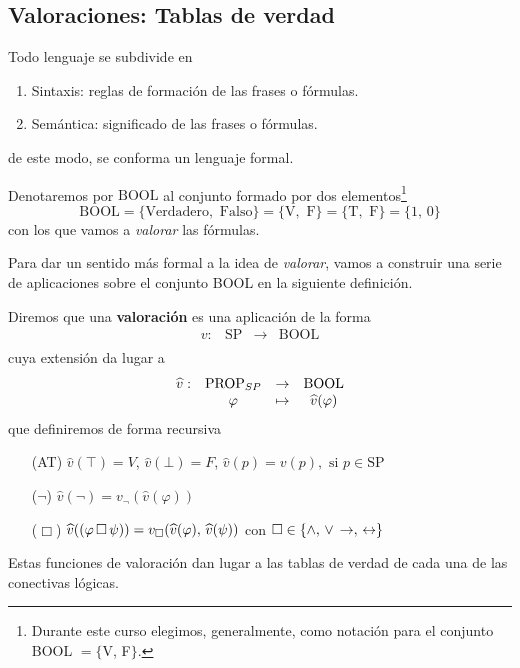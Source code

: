 \subsection*{Valoraciones: Tablas de verdad}
Todo lenguaje se subdivide en 
\begin{enumerate}
	\item Sintaxis: reglas de formación de las frases o fórmulas. 
	\item Semántica: significado de las frases o fórmulas. 
\end{enumerate}
de este modo, se conforma un lenguaje formal. 

\begin{definition} Denotaremos por $\mbox{BOOL}$ al conjunto formado por dos elementos\footnote{Durante este curso elegimos, generalmente, como notación para el conjunto BOOL $=\{$V, F$\}$.} 
\[ \mbox{BOOL}= \{\mbox{Verdadero}, \mbox{ Falso} \}=\{\mbox{V}, \mbox{ F} \}=\{\mbox{T}, \mbox{ F} \}=\{1,\, 0\} \]
con los que vamos a \textit{valorar} las fórmulas. 
\end{definition}

Para dar un sentido más formal a la idea de \textit{valorar}, vamos a construir una serie de aplicaciones sobre el conjunto BOOL en la siguiente definición. 
\begin{definition} Diremos que una \textbf{valoración} es una aplicación de la forma 
\[ \begin{matrix}
v: & \mbox{SP} & \rightarrow &\mbox{BOOL}\\
\end{matrix} \]
cuya extensión da lugar a 
\[ \begin{matrix}
\widehat{v}: & \mbox{PROP}_{SP} & \rightarrow &\mbox{BOOL}\\
&\varphi &  \mapsto & \widehat{v}(\varphi)
\end{matrix} \]
que definiremos de forma recursiva
\begin{itemize}
	\item[(AT)] $\widehat{v}(\top)=V$, $\widehat{v}(\bot)=F$, $\widehat{v}(p)=v(p), \mbox{ si } p \in \mbox{SP}$
	\item[($\neg$)] $\widehat{v}(\neg)=v_{\neg}(\widehat{v}(\varphi))$
	\item[($\Box$)] $\widehat{v}((\varphi \, \Box \, \psi))= v_{\Box}(\widehat{v}(\varphi), \, \widehat{v}(\psi))$ con $\Box \in \{ \wedge, \, \lor \, \rightarrow, \, \leftrightarrow \}$
\end{itemize}
\end{definition}

Estas funciones de valoración dan lugar a las tablas de verdad de cada una de las conectivas lógicas. 

